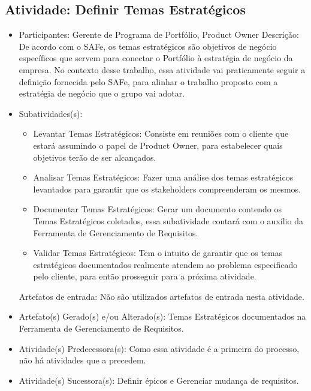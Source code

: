 \subsection{Atividade: Definir Temas Estratégicos}
\begin{itemize}
\item Participantes: Gerente de Programa de Portfólio, Product Owner
Descrição: De acordo com o SAFe, os temas estratégicos são objetivos de negócio específicos que servem para conectar o Portfólio à estratégia de negócio da empresa. No contexto desse trabalho, essa atividade vai praticamente seguir a definição fornecida pelo SAFe, para alinhar o trabalho proposto com a estratégia de negócio que o grupo vai adotar. 

\item Subatividades(s): 
    \begin{itemize}
    \item Levantar Temas Estratégicos: Consiste em reuniões com o cliente que estará assumindo o papel de Product Owner, para estabelecer quais objetivos terão de ser alcançados.
    \item Analisar Temas Estratégicos: Fazer uma análise dos temas estratégicos levantados para garantir que os stakeholders compreenderam os mesmos.
    \item Documentar Temas Estratégicos:  Gerar um documento contendo os Temas Estratégicos coletados, essa subatividade contará com o auxílio da Ferramenta de Gerenciamento de Requisitos.
    \item Validar Temas Estratégicos: Tem o intuito de garantir que os temas estratégicos documentados realmente atendem ao problema especificado pelo cliente, para então prosseguir para a próxima atividade.
    \end{itemize}
	Artefatos de entrada:
    Não são utilizados artefatos de entrada nesta atividade.
 
\item Artefato(s) Gerado(s) e/ou Alterado(s): Temas Estratégicos documentados na Ferramenta de Gerenciamento de Requisitos.
\item Atividade(s) Predecessora(s): Como essa atividade é a primeira do processo, não há atividades que a precedem.
\item Atividade(s) Sucessora(s): Definir épicos e Gerenciar mudança de requisitos.

\end{itemize}

